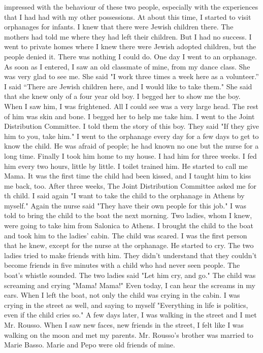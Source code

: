 impressed with the behaviour of these two people, especially with the experiences that I had had with my other possessions. 
At about this time, I started to visit orphanages for infants. I 
knew that there were Jewish children there. The mothers had told me 
where they had left their children. But I had no success. I went to 
private homes where I knew there were Jewish adopted children, but the 
people denied it. There was nothing I could do. 
One day I went to an orphanage. As soon as I entered, I saw an old 
classmate of mine, from my dance class. She was very glad to see me. 
She said "I work three times a week here as a volunteer.” 
I said “There are Jewish children here, and I would like to take them." She said that 
she knew only of a four year old boy. I begged her to show me the boy. 
When I saw him, I was frightened. All I could see was a very large head. 
The rest of him was skin and bone. I begged her to help me take him. 
I went to the Joint Distribution Committee. I told them the story 
of this boy. They said "If they give him to you, take him." I went to 
the orphanage every day for a few days to get to know the child. He was 
afraid of people; he had known no one but the nurse for a long time. Finally I took him home to my house. I had him for three weeks. I fed him every two hours, little by little. I toilet trained him. He started to
call me Mama. It was the first time the child had been kissed, and I 
taught him to kiss me back, too. 
After three weeks, The Joint Distribution Committee asked me for th 
child. I said again "I want to take the child to the orphanage in Athens by
myself." Again the nurse said "They have their own people for 
this job." I was told to bring the child to the boat the next morning. 
Two ladies, whom I knew, were going to take him from Salonica to Athens. 
I brought the child to the boat and took him to the ladies' cabin. The 
child was scared. I was the first person that he knew, except for the 
nurse at the orphanage. He started to cry. The two ladies tried to make 
friends with him. They didn't understand that they couldn't become 
friends in five minutes with a child who had never seen people. The 
boat's whistle sounded. The two ladies said "Let him cry, and go." The 
child was screaming and crying "Mama! Mama!" Even today, I can hear the 
screams in my ears. When I left the boat, not only the child was crying 
in the cabin. I was crying in the street as well, and saying to myself 
"Everything in life is politics, even if the child cries so." 
A few days later, I was walking in the street and I met Mr.
Rousso. When I saw new faces, new friends in the street, I felt like I 
was walking on the moon and met my parents. Mr. Rousso's brother 
was married to Marie Basso. Marie and Pepo were old friends of mine. 

